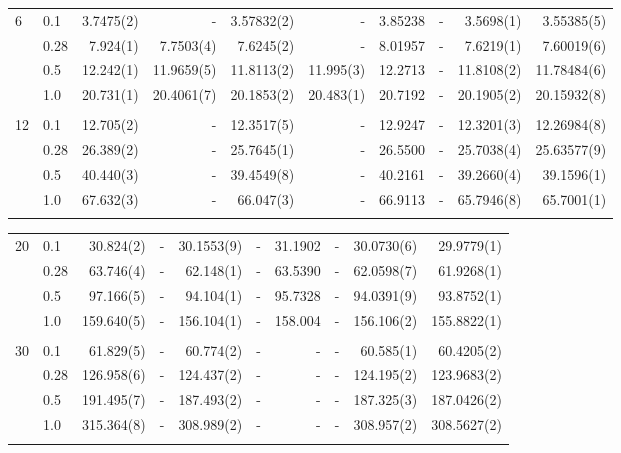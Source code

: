 \begin{landscape}
\begin{table} [H]
\begin{tabularx}{\hsize}{l:l|RRRRRRRR}
		6 & 0.1 & 3.7475(2) & - & 3.57832(2) & - & 3.85238 & - & 3.5698(1) & 3.55385(5) \\ 
		& 0.28 & 7.924(1) & 7.7503(4) & 7.6245(2) & - & 8.01957 & - & 7.6219(1) & 7.60019(6) \\
		& 0.5 & 12.242(1) & 11.9659(5) & 11.8113(2) & 11.995(3) & 12.2713 & - & 11.8108(2) & 11.78484(6) \\
		& 1.0 & 20.731(1) & 20.4061(7) & 20.1853(2) & 20.483(1) & 20.7192 & - & 20.1905(2) & 20.15932(8) \\ \hdashline \\
		
		12 & 0.1 & 12.705(2) & - & 12.3517(5) & - & 12.9247 & - & 12.3201(3) & 12.26984(8) \\ 
		& 0.28 & 26.389(2) & - & 25.7645(1) & - & 26.5500 & - & 25.7038(4) & 25.63577(9) \\
		& 0.5 & 40.440(3) & - & 39.4549(8) & - & 40.2161 & - & 39.2660(4) & 39.1596(1) \\
		& 1.0 & 67.632(3) & - & 66.047(3) & - & 66.9113 & - & 65.7946(8) & 65.7001(1) \\ \hdashline
	\end{tabularx}
\end{table}

\begin{table} [H]
	\begin{tabularx}{\hsize}{l:l|RRRRRRRR} \\
		\label{tab:quantumdotswinteraction2D2}
		20 & 0.1 & 30.824(2) & - & 30.1553(9) & - & 31.1902 & - & 30.0730(6) & 29.9779(1) \\ 
		& 0.28 & 63.746(4) & - & 62.148(1) & - & 63.5390 & - & 62.0598(7) & 61.9268(1) \\
		& 0.5 & 97.166(5) & - & 94.104(1) & - & 95.7328 & - & 94.0391(9) & 93.8752(1) \\
		& 1.0 & 159.640(5) & - & 156.104(1) & - & 158.004 & - & 156.106(2) & 155.8822(1) \\ \hdashline \\
		
		30 & 0.1 & 61.829(5) & - & 60.774(2) & - & - & - & 60.585(1) & 60.4205(2) \\ 
		& 0.28 & 126.958(6) & - & 124.437(2) & - & - & - & 124.195(2) & 123.9683(2) \\
		& 0.5 & 191.495(7) & - & 187.493(2) & - & - & - & 187.325(3) & 187.0426(2) \\
		& 1.0 & 315.364(8) & - & 308.989(2) & - & - & - & 308.957(2) & 308.5627(2) \\ \hdashline \\
		

\end{tabularx}
\end{table}
\end{landscape}
